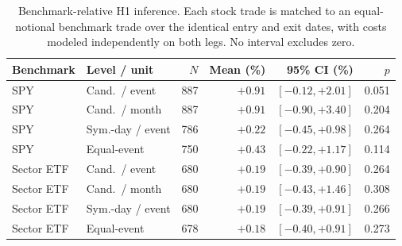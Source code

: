 \begin{table}[t]
\caption{Benchmark-relative H1 inference. Each stock trade is matched to an equal-notional benchmark trade over the identical entry and exit dates, with costs modeled independently on both legs. No interval excludes zero.}
\label{tab:benchmark}
\centering
\footnotesize
\setlength{\tabcolsep}{2.6pt}
\begin{tabular}{llrrrr}
\toprule
Benchmark & Level / unit & $N$ & Mean (\%) & 95\% CI (\%) & $p$ \\
\midrule
SPY & Cand.\ / event & 887 & $+0.91$ & $[-0.12,+2.01]$ & 0.051 \\
SPY & Cand.\ / month & 887 & $+0.91$ & $[-0.90,+3.40]$ & 0.204 \\
SPY & Sym.-day / event & 786 & $+0.22$ & $[-0.45,+0.98]$ & 0.264 \\
SPY & Equal-event & 750 & $+0.43$ & $[-0.22,+1.17]$ & 0.114 \\
Sector ETF & Cand.\ / event & 680 & $+0.19$ & $[-0.39,+0.90]$ & 0.264 \\
Sector ETF & Cand.\ / month & 680 & $+0.19$ & $[-0.43,+1.46]$ & 0.308 \\
Sector ETF & Sym.-day / event & 680 & $+0.19$ & $[-0.39,+0.91]$ & 0.266 \\
Sector ETF & Equal-event & 678 & $+0.18$ & $[-0.40,+0.91]$ & 0.273 \\
\bottomrule
\end{tabular}
\end{table}
